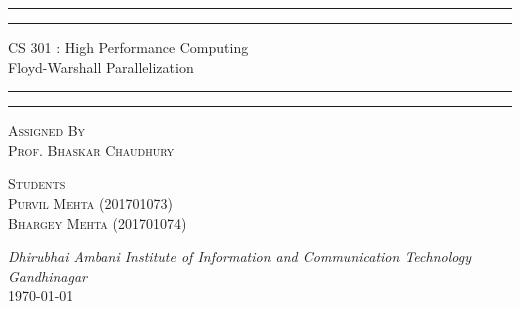 \documentclass{article}
\begin{document}
\begin{titlepage}
	\centering 
	\scshape
	\vspace*{12\baselineskip}
	\rule{\textwidth}{1.6pt}\vspace*{-\baselineskip}\vspace*{2pt}
	\rule{\textwidth}{0.4pt} 
	\vspace{0.75\baselineskip}
	
	{\Large CS 301 : High Performance Computing \\\vspace{0.75\baselineskip} Floyd-Warshall Parallelization}
	\vspace{0.75\baselineskip}
	
	\rule{\textwidth}{0.4pt}\vspace*{-\baselineskip}\vspace{3.2pt} 
	\rule{\textwidth}{1.6pt}
	
	
	\vspace*{3\baselineskip}
	{\scshape\large Assigned By\\ Prof. Bhaskar Chaudhury}
	
	\vspace{3\baselineskip} %
	
	
	{\scshape\large Students\\Purvil Mehta (201701073) \\ Bhargey Mehta (201701074) \\} 
	
	\vspace{1\baselineskip} 
	
	\textit{Dhirubhai Ambani Institute of Information and Communication Technology \\ Gandhinagar\\} 
	\vspace*{2\baselineskip}
	\today


\end{titlepage}
\newpage
\tableofcontents




\end{document}
